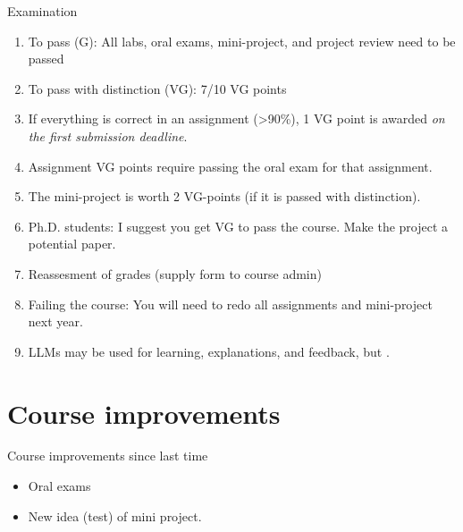 \documentclass[10pt]{beamer}
\begin{document}
\begin{frame}{Examination}

\begin{enumerate}
\item To pass (G): All labs, oral exams, mini-project, and project review need to be passed\pause
\item To pass with distinction (VG): 7/10 VG points\pause
\item If everything is correct in an assignment (>90\%), 1 VG point is awarded \emph{on the first submission deadline}.\pause
\item Assignment VG points require passing the oral exam for that assignment.\pause
\item The mini-project is worth 2 VG-points (if it is passed with distinction).
\item Ph.D. students: I suggest you get VG to pass the course. Make the project a potential paper.
\item Reassesment of grades (supply form to course admin)
\item Failing the course: You will need to redo all assignments and mini-project next year.
\item LLMs may be used for learning, explanations, and feedback, but .
\end{enumerate}

\end{frame}

\section{Course improvements}
\frame{\sectionpage}

\begin{frame}{Course improvements since last time}


\begin{itemize}
  \item Oral exams
  \item New idea (test) of mini project.
\end{itemize}

\end{frame}


\frame{\sectionpage}
\end{document}
